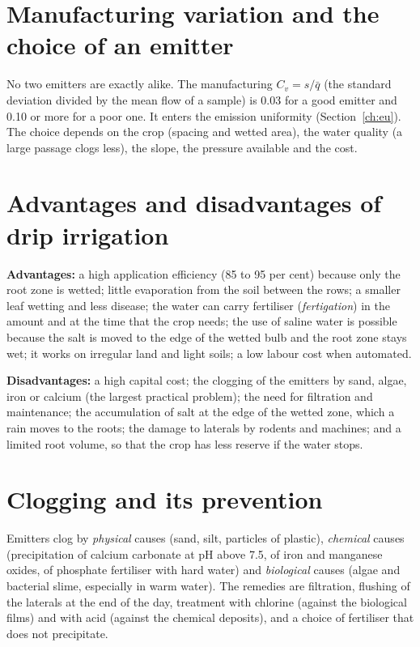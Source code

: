\section{Manufacturing variation and the choice of an emitter}
No two emitters are exactly alike. The manufacturing  $C_v=s/\bar q$ (the standard deviation divided by the mean flow of a sample) is 0.03 for a good emitter and 0.10 or more for a poor one. It enters the emission uniformity (Section~\ref{ch:eu}). The choice depends on the crop (spacing and wetted area), the water quality (a large passage clogs less), the slope, the pressure available and the cost.

\section{Advantages and disadvantages of drip irrigation}
\textbf{Advantages:} a high application efficiency (85 to 95 per cent) because only the root zone is wetted; little evaporation from the soil between the rows; a smaller leaf wetting and less disease; the water can carry fertiliser (\emph{fertigation}) in the amount and at the time that the crop needs; the use of saline water is possible because the salt is moved to the edge of the wetted bulb and the root zone stays wet; it works on irregular land and light soils; a low labour cost when automated.
\par\noindent \textbf{Disadvantages:} a high capital cost; the clogging of the emitters by sand, algae, iron or calcium (the largest practical problem); the need for filtration and maintenance; the accumulation of salt at the edge of the wetted zone, which a rain moves to the roots; the damage to laterals by rodents and machines; and a limited root volume, so that the crop has less reserve if the water stops.

\section{Clogging and its prevention}
Emitters clog by \emph{physical} causes (sand, silt, particles of plastic), \emph{chemical} causes (precipitation of calcium carbonate at pH above 7.5, of iron and manganese oxides, of phosphate fertiliser with hard water) and \emph{biological} causes (algae and bacterial slime, especially in warm water). The remedies are filtration, flushing of the laterals at the end of the day, treatment with chlorine (against the biological films) and with acid (against the chemical deposits), and a choice of fertiliser that does not precipitate.

